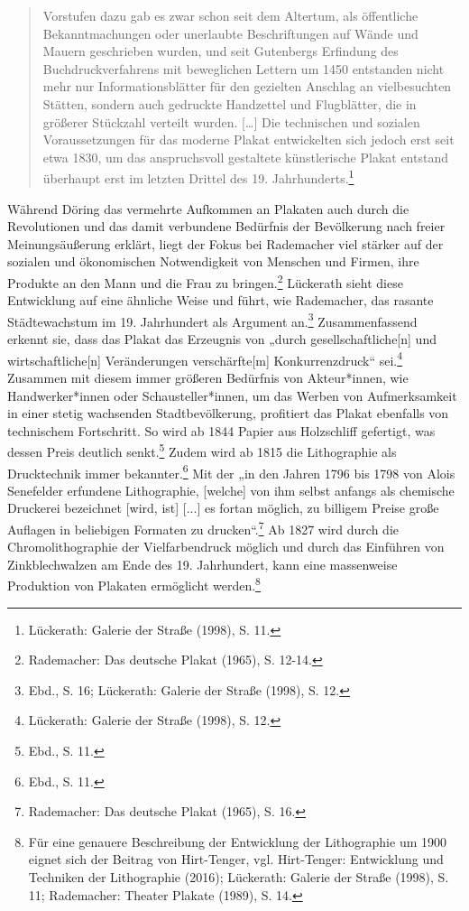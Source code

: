 \documentclass[a4paper,12pt,ngerman]{article}
\begin{document}
\blockquote{\fontsize{10pt}{12pt}\selectfont Vorstufen dazu gab es zwar schon seit dem Altertum, als öffentliche Bekanntmachungen oder unerlaubte Beschriftungen auf Wände und Mauern geschrieben wurden, und seit Gutenbergs Erfindung des Buchdruckverfahrens mit beweglichen Lettern um 1450 entstanden nicht mehr nur Informationsblätter für den gezielten Anschlag an vielbesuchten Stätten, sondern auch gedruckte Handzettel und Flugblätter, die in größerer Stückzahl verteilt wurden. […] Die technischen und sozialen Voraussetzungen für das moderne Plakat entwickelten sich jedoch erst seit etwa 1830, um das anspruchsvoll gestaltete künstlerische Plakat entstand überhaupt erst im letzten Drittel des 19. Jahrhunderts.\footnote{Lückerath: Galerie der Straße (1998), S. 11.}\\}

Während Döring das vermehrte Aufkommen an Plakaten auch durch die Revolutionen und das damit verbundene Bedürfnis der Bevölkerung nach freier Meinungsäußerung erklärt, liegt der Fokus bei Rademacher viel stärker auf der sozialen und ökonomischen Notwendigkeit von Menschen und Firmen, ihre Produkte an den Mann und die Frau zu bringen.\footnote{Rademacher: Das deutsche Plakat (1965), S. 12-14.}  Lückerath sieht diese Entwicklung auf eine ähnliche Weise und führt, wie Rademacher, das rasante Städtewachstum im 19. Jahrhundert als Argument an.\footnote{Ebd., S. 16; Lückerath: Galerie der Straße (1998), S. 12.}  Zusammenfassend erkennt sie, dass das Plakat das Erzeugnis von „durch gesellschaftliche[n] und wirtschaftliche[n] Veränderungen verschärfte[m] Konkurrenzdruck“ sei.\footnote{Lückerath: Galerie der Straße (1998), S. 12.} \\
Zusammen mit diesem immer größeren Bedürfnis von Akteur*innen, wie Handwerker*innen oder Schausteller*innen, um das Werben von Aufmerksamkeit in einer stetig wachsenden Stadtbevölkerung, profitiert das Plakat ebenfalls von technischem Fortschritt. So wird ab 1844 Papier aus Holzschliff gefertigt, was dessen Preis deutlich senkt.\footnote{Ebd., S. 11.} Zudem wird ab 1815 die Lithographie als Drucktechnik immer bekannter.\footnote{Ebd., S. 11.}  Mit der „in den Jahren 1796 bis 1798 von Alois Senefelder erfundene Lithographie, [welche] von ihm selbst anfangs als chemische Druckerei bezeichnet [wird, ist] [...] es fortan möglich, zu billigem Preise große Auflagen in beliebigen Formaten zu drucken“.\footnote{Rademacher: Das deutsche Plakat (1965), S. 16.} Ab 1827 wird durch die Chromolithographie der Vielfarbendruck möglich und durch das Einführen von Zinkblechwalzen am Ende des 19. Jahrhundert, kann eine massenweise Produktion von Plakaten ermöglicht werden.\footnote{Für eine genauere Beschreibung der Entwicklung der Lithographie um 1900 eignet sich der Beitrag von Hirt-Tenger, vgl. Hirt-Tenger: Entwicklung und Techniken der Lithographie (2016); Lückerath: Galerie der Straße (1998), S. 11; Rademacher: Theater Plakate (1989), S. 14.} \\ 
\end{document}
